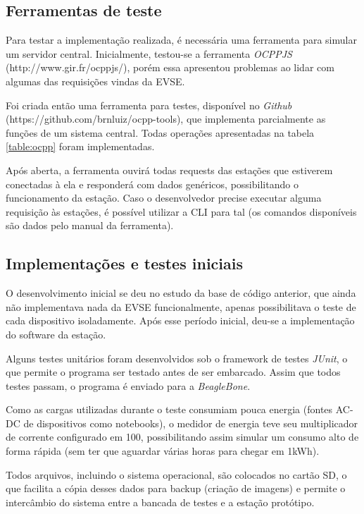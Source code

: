     \subsection{Ferramentas de teste}

      Para testar a implementação realizada, é necessária uma ferramenta para simular um servidor central. Inicialmente, testou-se a ferramenta \textit{OCPPJS} (http://www.gir.fr/ocppjs/), porém essa apresentou problemas ao lidar com algumas das requisições vindas da \ac{EVSE}.

      Foi criada então uma ferramenta para testes, disponível no \textit{Github} (https://github.com/brnluiz/ocpp-tools), que implementa parcialmente as funções de um sistema central. Todas operações apresentadas na tabela \ref{table:ocpp} foram implementadas.

      Após aberta, a ferramenta ouvirá todas requests das estações que estiverem conectadas à ela e responderá com dados genéricos, possibilitando o funcionamento da estação. Caso o desenvolvedor precise executar alguma requisição às estações, é possível utilizar a \ac{CLI} para tal (os comandos disponíveis são dados pelo manual da ferramenta).

    \subsection{Implementações e testes iniciais}

      O desenvolvimento inicial se deu no estudo da base de código anterior, que ainda não implementava nada da \ac{EVSE} funcionalmente, apenas possibilitava o teste de cada dispositivo isoladamente. Após esse período inicial, deu-se a implementação do software da estação.

      Alguns testes unitários foram desenvolvidos sob o framework de testes \textit{JUnit}, o que permite o programa ser testado antes de ser embarcado. Assim que todos testes passam, o programa é enviado para a \textit{BeagleBone}.

      Como as cargas utilizadas durante o teste consumiam pouca energia (fontes AC-DC de dispositivos como notebooks), o medidor de energia teve seu multiplicador de corrente configurado em 100, possibilitando assim simular um consumo alto de forma rápida (sem ter que aguardar várias horas para chegar em 1kWh).

      Todos arquivos, incluindo o sistema operacional, são colocados no cartão SD, o que facilita a cópia desses dados para backup (criação de imagens) e permite o intercâmbio do sistema entre a bancada de testes e a estação protótipo.

